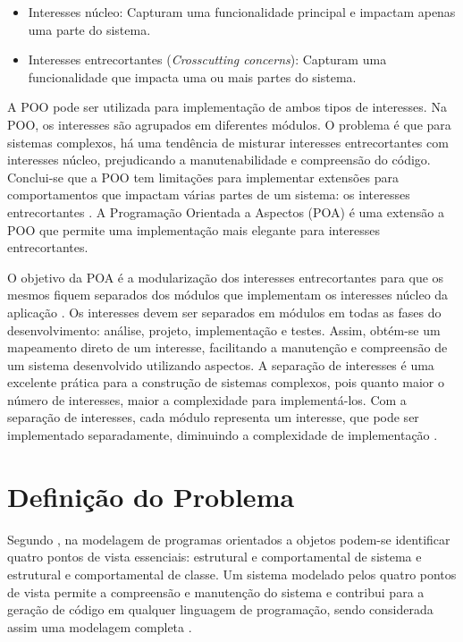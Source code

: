 \begin{itemize}
  \item Interesses núcleo: Capturam uma funcionalidade principal e impactam apenas uma parte do sistema.
  \item Interesses entrecortantes (\textit{Crosscutting concerns}): Capturam uma funcionalidade que impacta uma ou mais partes do sistema. 
\end{itemize}

A POO pode ser utilizada para implementação de ambos tipos de interesses. Na POO, os interesses são agrupados em diferentes módulos. O problema é que
para sistemas complexos, há uma tendência de misturar interesses entrecortantes com interesses núcleo, prejudicando a manutenabilidade e compreensão do código. 
Conclui-se que a POO tem limitações para implementar extensões para comportamentos que impactam várias partes de um sistema: os interesses
entrecortantes \cite{Kiczales97aspect-orientedprogramming}. A Programação Orientada a Aspectos (POA)  é uma extensão a
POO que permite uma implementação mais elegante para interesses entrecortantes.

O objetivo da POA é a modularização dos interesses entrecortantes para que os mesmos fiquem separados dos módulos que implementam os interesses
núcleo da aplicação \cite{Laddad:2003:AAP:993468}. Os interesses devem ser separados em módulos em todas as fases do desenvolvimento:
análise, projeto, implementação e testes. Assim, obtém-se um mapeamento direto de um interesse, facilitando a manutenção e compreensão de um sistema
desenvolvido utilizando aspectos. A separação de interesses é uma excelente prática para a construção de sistemas complexos, pois quanto maior o
número de interesses, maior a complexidade para implementá-los. Com a separação de interesses, cada módulo representa um interesse, que pode ser
implementado separadamente, diminuindo a complexidade de implementação \cite{Jacobson:2004:ASD:1062430}.

\section{Definição do Problema}

Segundo \cite{silva:00}, na modelagem de programas orientados a objetos podem-se identificar quatro pontos de vista essenciais: estrutural e
comportamental de sistema e estrutural e comportamental de classe. Um sistema modelado pelos quatro pontos de vista permite a compreensão e manutenção
do sistema e contribui para a geração de código em qualquer linguagem de programação, sendo considerada assim uma modelagem completa \cite{silva:07}.

